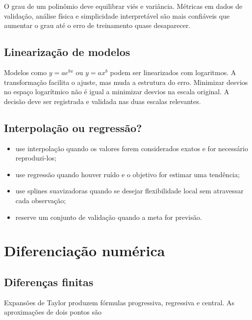 \documentclass[12pt,a4paper,openany]{book}
\begin{document}
O grau de um polinômio deve equilibrar viés e variância. Métricas em dados de validação, análise física e simplicidade interpretável são mais confiáveis que aumentar o grau até o erro de treinamento quase desaparecer.



\section{Linearização de modelos}



Modelos como $y=a e^{bx}$ ou $y=a x^b$ podem ser linearizados com logaritmos. A transformação facilita o ajuste, mas muda a estrutura do erro. Minimizar desvios no espaço logarítmico não é igual a minimizar desvios na escala original. A decisão deve ser registrada e validada nas duas escalas relevantes.



\section{Interpolação ou regressão?}



\begin{itemize}
\item use interpolação quando os valores forem considerados exatos e for necessário reproduzi-los;
\item use regressão quando houver ruído e o objetivo for estimar uma tendência;
\item use splines suavizadoras quando se desejar flexibilidade local sem atravessar cada observação;
\item reserve um conjunto de validação quando a meta for previsão.
\end{itemize}



\chapter{Diferenciação numérica}



\section{Diferenças finitas}



Expansões de Taylor produzem fórmulas progressiva, regressiva e central. As aproximações de dois pontos são
\end{document}
